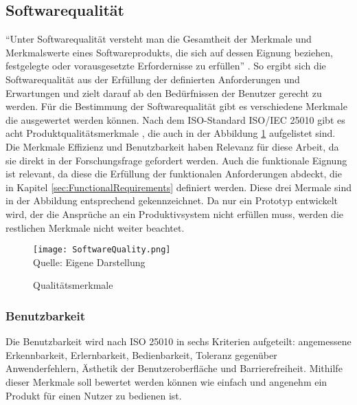 \subsection{Softwarequalität}
``Unter Softwarequalität versteht man die Gesamtheit der Merkmale und Merkmalswerte eines Softwareprodukts, die sich auf dessen Eignung beziehen, festgelegte oder vorausgesetzte Erfordernisse zu erfüllen'' \cite[S.~257]{Balzert1998}. So ergibt sich die Softwarequalität aus der Erfüllung der definierten Anforderungen und Erwartungen und zielt darauf ab den Bedürfnissen der Benutzer gerecht zu werden. Für die Bestimmung der Softwarequalität gibt es verschiedene Merkmale die ausgewertet werden können. Nach dem ISO-Standard ISO/IEC 25010 gibt es acht Produktqualitätsmerkmale \cite{ISO25010}, die auch in der Abbildung \ref{fig:SoftwareQuality} aufgelistet sind. Die Merkmale Effizienz und Benutzbarkeit haben Relevanz für diese Arbeit, da sie direkt in der Forschungsfrage gefordert werden. Auch die funktionale Eignung ist relevant, da diese die Erfüllung der funktionalen Anforderungen abdeckt, die in Kapitel \ref{sec:FunctionalRequirements} definiert werden. Diese drei Mermale sind in der Abbildung entsprechend gekennzeichnet. Da nur ein Prototyp entwickelt wird, der die Ansprüche an ein Produktivsystem nicht erfüllen muss, werden die restlichen Merkmale nicht weiter beachtet.

\begin{figure}[H]
    \caption{Qualitätsmerkmale}\label{fig:SoftwareQuality}
    \texttt{[image: SoftwareQuality.png]}
    \\
    Quelle: Eigene Darstellung
\end{figure}

\subsubsection{Benutzbarkeit}
Die Benutzbarkeit wird nach ISO 25010 in sechs Kriterien aufgeteilt: angemessene Erkennbarkeit, Erlernbarkeit, Bedienbarkeit, Toleranz gegenüber Anwenderfehlern, Ästhetik der Benutzeroberfläche und Barrierefreiheit.\cite{ISO25010} Mithilfe dieser Merkmale soll bewertet werden können wie einfach und angenehm ein Produkt für einen Nutzer zu bedienen ist.

